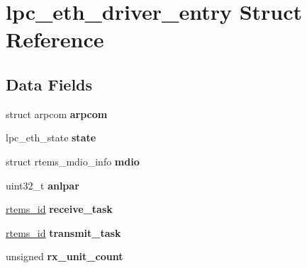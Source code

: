 \hypertarget{structlpc__eth__driver__entry}{}\section{lpc\+\_\+eth\+\_\+driver\+\_\+entry Struct Reference}
\label{structlpc__eth__driver__entry}
\subsection*{Data Fields}
\begin{DoxyCompactItemize}
\item 
\mbox{\label{structlpc__eth__driver__entry_aa5d2324af2bedd328ea1dfd1db11fa82}} 
struct arpcom {\bfseries arpcom}
\item 
\mbox{\label{structlpc__eth__driver__entry_a05869f69f912c9098c0a8dd8e5d3c049}} 
lpc\+\_\+eth\+\_\+state {\bfseries state}
\item 
\mbox{\label{structlpc__eth__driver__entry_aa8922fe79edc2f05ca4b27cd8138ce6c}} 
struct rtems\+\_\+mdio\+\_\+info {\bfseries mdio}
\item 
\mbox{\label{structlpc__eth__driver__entry_a5bed0eaf1b564eb241935062f1dd2aa1}} 
uint32\+\_\+t {\bfseries anlpar}
\item 
\mbox{\label{structlpc__eth__driver__entry_ac323279caff0da10b1d5121821948bbf}} 
\mbox{\hyperlink{group__ClassicTasks_gab20892b814dced7dd4e5b9bf42becd57}{rtems\+\_\+id}} {\bfseries receive\+\_\+task}
\item 
\mbox{\label{structlpc__eth__driver__entry_af99b936c7a6e8f06937563b330c08ba8}} 
\mbox{\hyperlink{group__ClassicTasks_gab20892b814dced7dd4e5b9bf42becd57}{rtems\+\_\+id}} {\bfseries transmit\+\_\+task}
\item 
\mbox{\label{structlpc__eth__driver__entry_a9adf70b23db3841a379f92a9458e9189}} 
unsigned {\bfseries rx\+\_\+unit\+\_\+count}
\item 
\mbox{\label{structlpc__eth__driver__entry_af882c058ac23a782508fa2e466a5fb1c}} 

\end{DoxyCompactItemize}
